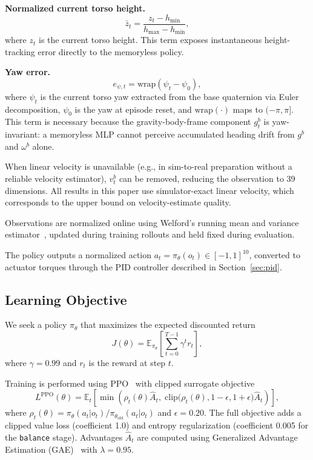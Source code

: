 \documentclass[conference]{IEEEtran}
\begin{document}
\noindent\textbf{Normalized current torso height.}
\begin{equation}
\bar{z}_t = \frac{z_t - h_{\min}}{h_{\max} - h_{\min}},
\label{eq:current_height_norm}
\end{equation}
where $z_t$ is the current torso height.  This term exposes instantaneous
height-tracking error directly to the memoryless policy.

\noindent\textbf{Yaw error.}
\begin{equation}
e_{\psi,t} = \mathrm{wrap}\!\left(\psi_t - \psi_0\right),
\label{eq:yaw_error}
\end{equation}
where $\psi_t$ is the current torso yaw extracted from the base
quaternion via Euler decomposition, $\psi_0$ is the yaw at episode
reset, and $\mathrm{wrap}(\cdot)$ maps to $(-\pi, \pi]$.
This term is necessary because the gravity-body-frame component
$g_t^b$ is yaw-invariant: a memoryless MLP cannot perceive
accumulated heading drift from $g^b$ and $\omega^b$ alone.

When linear velocity is unavailable (e.g., in sim-to-real preparation
without a reliable velocity estimator), $v_t^b$ can be removed,
reducing the observation to 39 dimensions.
All results in this paper use simulator-exact linear velocity,
which corresponds to the upper bound on velocity-estimate quality.

Observations are normalized online using Welford's running mean and
variance estimator~\cite{welford1962}, updated during training
rollouts and held fixed during evaluation.

The policy outputs a normalized action
$a_t = \pi_\theta(o_t) \in [-1,1]^{10}$,
converted to actuator torques through the PID controller
described in Section~\ref{sec:pid}.

\subsection{Learning Objective}
We seek a policy $\pi_\theta$ that maximizes the expected discounted return
\begin{equation}
J(\theta)=\mathbb{E}_{\pi_\theta}\!\left[\sum_{t=0}^{T-1}\gamma^t r_t\right],
\end{equation}
where $\gamma = 0.99$ and $r_t$ is the reward at step $t$.

Training is performed using PPO~\cite{ppo} with clipped surrogate objective
\begin{equation}
L^{\mathrm{PPO}}(\theta) =
\mathbb{E}_t\!\left[
\min\!\left(
\rho_t(\theta)\hat{A}_t,\;
\mathrm{clip}\big(\rho_t(\theta), 1-\epsilon, 1+\epsilon\big)\hat{A}_t
\right)
\right],
\end{equation}
where $\rho_t(\theta)=\pi_\theta(a_t|o_t)/\pi_{\theta_{\mathrm{old}}}(a_t|o_t)$
and $\epsilon=0.20$.
The full objective adds a clipped value loss (coefficient 1.0) and
entropy regularization (coefficient 0.005 for the \texttt{balance} stage).
Advantages $\hat{A}_t$ are computed using Generalized Advantage
Estimation (GAE)~\cite{gae} with $\lambda=0.95$.
\end{document}
